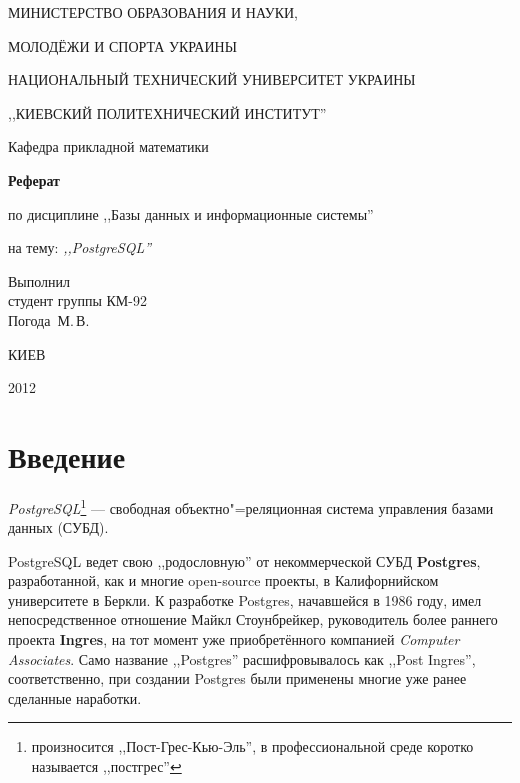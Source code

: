 \documentclass[a4paper,12pt,notitlepage,headsepline,pdftex]{scrartcl}
\begin{document}
\begin{titlepage}
  \begin{center}
    \large
    \MakeUppercase{Министерство образования и науки,}

    \MakeUppercase{молодёжи и спорта Украины}

    \MakeUppercase{Национальный технический университет Украины}

    \MakeUppercase{,,Киевский политехнический институт''}

    \addvspace{6pt}

    \normalsize
    Кафедра прикладной математики

    \vfill

    \textbf{Реферат}

    по дисциплине ,,Базы данных и информационные системы''

    на тему: \textit{,,PostgreSQL''}
  \end{center}

  \vfill

  \noindent
  Выполнил\\
  студент группы КМ-92\\
  Погода~М.\,В.\\
  \vfill

  \begin{center}
    КИЕВ

    2012
  \end{center}
\end{titlepage}

\tableofcontents
\clearpage

\section{Введение}
  \emph{PostgreSQL}\footnote{произносится ,,Пост-Грес-Кью-Эль'', в
    профессиональной среде коротко называется ,,постгрес''} --- свободная
  объектно"=реляционная система управления базами данных (СУБД).

  PostgreSQL ведет свою ,,родословную'' от некоммерческой СУБД
  \textbf{Postgres}, разработанной, как и многие open-source проекты, в
  Калифорнийском университете в Беркли.
  К разработке Postgres, начавшейся в 1986 году, имел непосредственное
  отношение Майкл Стоунбрейкер, руководитель более раннего проекта
  \textbf{Ingres}, на тот момент уже приобретённого компанией \emph{Computer
  Associates}.
  Само название ,,Postgres'' расшифровывалось как ,,Post Ingres'',
  соответственно, при создании Postgres были применены многие уже ранее
  сделанные наработки.
\end{document}
